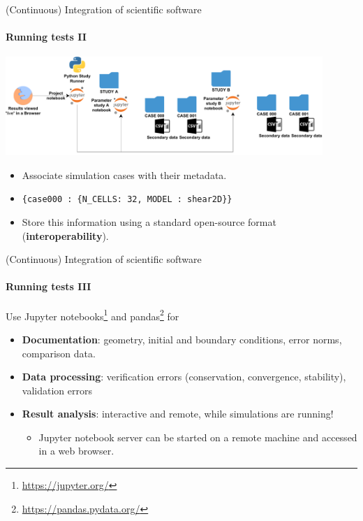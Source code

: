 \begin{frame}{(Continuous) Integration of scientific software} 
\framesubtitle{Running tests II}
\vfill

\begin{center}
    \includegraphics[width=0.9\textwidth]{figures/Cluster-Parameter-Study-Organization.pdf}
\end{center}

    \begin{itemize}
        \item Associate simulation cases with their metadata. 
        \item \texttt{\{case000 : \{N\_CELLS: 32, MODEL : shear2D\}\}}
        \item Store this information using a standard open-source format (\textbf{interoperability}).
    \end{itemize}

\end{frame}

\begin{frame}{(Continuous) Integration of scientific software} 
\framesubtitle{Running tests III}
\vfill

    Use Jupyter notebooks\footnote{\href{https://jupyter.org/}{https://jupyter.org/}} and pandas\footnote{\href{https://pandas.pydata.org/}{https://pandas.pydata.org/}} for 
    \begin{itemize}
        \item \textbf{Documentation}: geometry, initial and boundary conditions, error norms, comparison data.
        \item \textbf{Data processing}: verification errors (conservation, convergence, stability), validation errors 
        \item \textbf{Result analysis}: interactive and remote, while simulations are running!
            \begin{itemize}
                \item Jupyter notebook server can be started on a remote machine and accessed in a web browser.
            \end{itemize}
    \end{itemize}


\end{frame}

